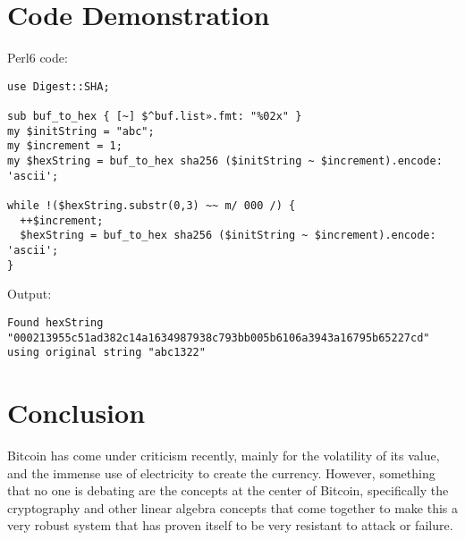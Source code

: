 \documentclass[12pt]{article}
\begin{document}
\section{Code Demonstration}
Perl6 code:
\begin{lstlisting}
use Digest::SHA;

sub buf_to_hex { [~] $^buf.list».fmt: "%02x" }
my $initString = "abc";
my $increment = 1;
my $hexString = buf_to_hex sha256 ($initString ~ $increment).encode: 'ascii';

while !($hexString.substr(0,3) ~~ m/ 000 /) {
  ++$increment;
  $hexString = buf_to_hex sha256 ($initString ~ $increment).encode: 'ascii';
}
\end{lstlisting}
\lstset{language=}
Output:
\begin{lstlisting}
Found hexString "000213955c51ad382c14a1634987938c793bb005b6106a3943a16795b65227cd" using original string "abc1322"
\end{lstlisting}

\section{Conclusion}

Bitcoin has come under criticism recently, mainly for the volatility of its value, and the immense use of electricity to create the currency. However, something that no one is debating are the concepts at the center of Bitcoin, specifically the cryptography and other linear algebra concepts that come together to make this a very robust system that has proven itself to be very resistant to attack or failure.
\end{document}
